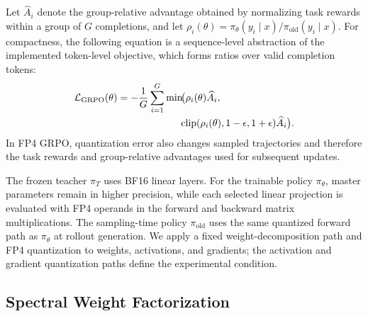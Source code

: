 \documentclass[letterpaper]{article}
\begin{document}
Let $\widehat A_i$ denote the group-relative advantage obtained by normalizing task rewards within a group of $G$ completions, and let $\rho_i(\theta)=\pi_\theta(y_i\mid x)/\pi_{\mathrm{old}}(y_i\mid x)$. For compactness, the following equation is a sequence-level abstraction of the implemented token-level objective, which forms ratios over valid completion tokens:
\begin{equation}
\begin{aligned}
\mathcal{L}_{\mathrm{GRPO}}(\theta)
&= -\frac{1}{G}\sum_{i=1}^{G}
\min\!\bigl(\rho_i(\theta)\widehat A_i, \\[-0.2ex]
&\hspace{2.2cm}\operatorname{clip}(\rho_i(\theta),1-\epsilon,1+\epsilon)\widehat A_i\bigr).
\end{aligned}
\end{equation}
In FP4 GRPO, quantization error also changes sampled trajectories and therefore the task rewards and group-relative advantages used for subsequent updates.

The frozen teacher $\pi_T$ uses BF16 linear layers. For the trainable policy $\pi_\theta$, master parameters remain in higher precision, while each selected linear projection is evaluated with FP4 operands in the forward and backward matrix multiplications. The sampling-time policy $\pi_{\mathrm{old}}$ uses the same quantized forward path as $\pi_\theta$ at rollout generation. We apply a fixed weight-decomposition path and FP4 quantization to weights, activations, and gradients; the activation and gradient quantization paths define the experimental condition.

\subsection{Spectral Weight Factorization}
\end{document}

